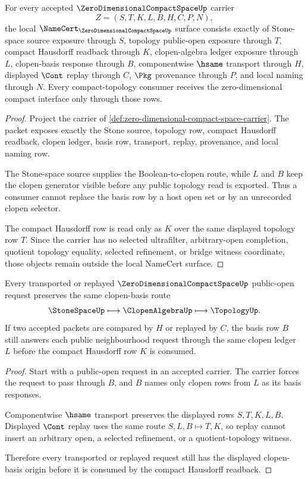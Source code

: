 \begin{theorem}
\label{thm:zero-dimensional-compact-space-namecert-obligations}
For every accepted $\ZeroDimensionalCompactSpaceUp$ carrier
$$
Z=(S,T,K,L,B,H,C,P,N),
$$
the local $\NameCert_{\ZeroDimensionalCompactSpaceUp}$ surface consists exactly of Stone-space source exposure through $S$, topology public-open exposure through $T$, compact Hausdorff readback through $K$, clopen-algebra ledger exposure through $L$, clopen-basis response through $B$, componentwise $\hsame$ transport through $H$, displayed $\Cont$ replay through $C$, $\Pkg$ provenance through $P$, and local naming through $N$. Every compact-topology consumer receives the zero-dimensional compact interface only through those rows.
\end{theorem}
\begin{proof}
Project the carrier of \autoref{def:zero-dimensional-compact-space-carrier}. The packet exposes exactly the Stone source, topology row, compact Hausdorff readback, clopen ledger, basis row, transport, replay, provenance, and local naming row.

The Stone-space source supplies the Boolean-to-clopen route, while $L$ and $B$ keep the clopen generator visible before any public topology read is exported. Thus a consumer cannot replace the basis row by a host open set or by an unrecorded clopen selector.

The compact Hausdorff row is read only as $K$ over the same displayed topology row $T$. Since the carrier has no selected ultrafilter, arbitrary-open completion, quotient topology equality, selected refinement, or bridge witness coordinate, those objects remain outside the local NameCert surface.
\end{proof}

\begin{theorem}
\label{thm:zero-dimensional-compact-space-clopen-basis-stability}
Every transported or replayed $\ZeroDimensionalCompactSpaceUp$ public-open request preserves the same clopen-basis route
$$
\StoneSpaceUp \longmapsto \ClopenAlgebraUp \longmapsto \TopologyUp .
$$
If two accepted packets are compared by $H$ or replayed by $C$, the basis row $B$ still answers each public neighbourhood request through the same clopen ledger $L$ before the compact Hausdorff row $K$ is consumed.
\end{theorem}
\begin{proof}
Start with a public-open request in an accepted carrier. The carrier forces the request to pass through $B$, and $B$ names only clopen rows from $L$ as its basis responses.

Componentwise $\hsame$ transport preserves the displayed rows $S,T,K,L,B$. Displayed $\Cont$ replay uses the same route $S,L,B \longmapsto T,K$, so replay cannot insert an arbitrary open, a selected refinement, or a quotient-topology witness.

Therefore every transported or replayed request still has the displayed clopen-basis origin before it is consumed by the compact Hausdorff readback.
\end{proof}

